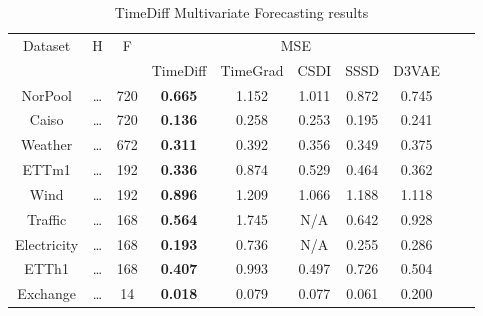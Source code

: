 \begin{table}[ht]
    \centering
    \begin{tabular}{cccccccccc}
        \toprule
        \multirow{2}{*}{Dataset} & \multirow{2}{*}{H} & \multirow{2}{*}{F} & \multicolumn{5}{c}{MSE} \\
        \cmidrule(lr){4-8}
         & & & TimeDiff & TimeGrad & CSDI & SSSD & D3VAE \\
        \midrule
        \multirow{1}{*}{NorPool} & \dots  & 720 & \textbf{0.665} & 1.152 & 1.011 & 0.872 & 0.745 \\
        \midrule
        \multirow{1}{*}{Caiso} & \dots  & 720 & \textbf{0.136} & 0.258 & 0.253 & 0.195 & 0.241 \\
        \midrule
        \multirow{1}{*}{Weather} & \dots  & 672 & \textbf{0.311} & 0.392 & 0.356 & 0.349 & 0.375 \\
        \midrule
        \multirow{1}{*}{ETTm1} & \dots  & 192 & \textbf{0.336} & 0.874 & 0.529 & 0.464 & 0.362 \\
        \midrule
        \multirow{1}{*}{Wind} & \dots  & 192 & \textbf{0.896} & 1.209 & 1.066 & 1.188 & 1.118 \\
        \midrule
        \multirow{1}{*}{Traffic} & \dots  & 168 & \textbf{0.564} & 1.745 & N/A & 0.642 & 0.928 \\
        \midrule
        \multirow{1}{*}{Electricity} & \dots  & 168 & \textbf{0.193} & 0.736 & N/A & 0.255 & 0.286 \\
        \midrule
        \multirow{1}{*}{ETTh1} & \dots  & 168 & \textbf{0.407} & 0.993 & 0.497 & 0.726 & 0.504 \\
        \midrule
        \multirow{1}{*}{Exchange} & \dots  & 14 & \textbf{0.018} & 0.079 & 0.077 & 0.061 & 0.200 \\
        \bottomrule
    \end{tabular}
    \caption{TimeDiff Multivariate Forecasting results \cite{shen_non-autoregressive_2023}}
    \label{tab:timediff-results}
\end{table}

